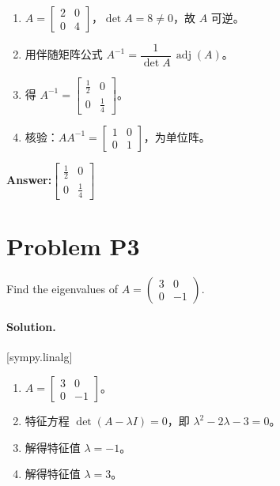 \documentclass[11pt,a4paper]{ctexart}
\newcommand{\solvertag}[1]{{\footnotesize\color{gray}\textsf{[#1]}}}
\begin{document}
\begin{enumerate}[leftmargin=*]
  \item $A = \left[\begin{matrix}2 & 0\\0 & 4\end{matrix}\right]$，$\det A = 8 \neq 0$，故 $A$ 可逆。
  \item 用伴随矩阵公式 $A^{-1} = \dfrac{1}{\det A}\,\operatorname{adj}(A)$。
  \item 得 $A^{-1} = \left[\begin{matrix}\frac{1}{2} & 0\\0 & \frac{1}{4}\end{matrix}\right]$。
  \item 核验：$A A^{-1} = \left[\begin{matrix}1 & 0\\0 & 1\end{matrix}\right]$，为单位阵。
\end{enumerate}

\noindent\textbf{Answer:}\quad $\left[\begin{matrix}\frac{1}{2} & 0\\0 & \frac{1}{4}\end{matrix}\right]$

\medskip

\section*{Problem P3}
Find the eigenvalues of $A = \begin{pmatrix} 3 & 0 \\ 0 & -1 \end{pmatrix}$.

\paragraph{Solution.} \solvertag{sympy.linalg} 

\begin{enumerate}[leftmargin=*]
  \item $A = \left[\begin{matrix}3 & 0\\0 & -1\end{matrix}\right]$。
  \item 特征方程 $\det(A - \lambda I) = 0$，即 $\lambda^{2} - 2 \lambda - 3 = 0$。
  \item 解得特征值 $\lambda = -1$。
  \item 解得特征值 $\lambda = 3$。
\end{enumerate}
\end{document}
